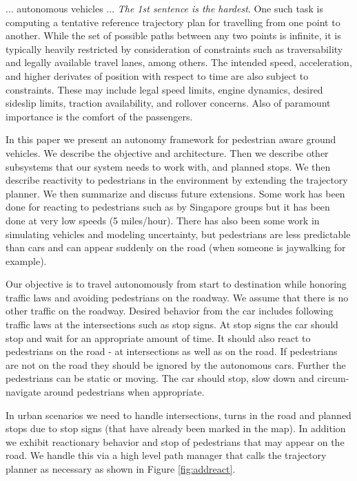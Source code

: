 \documentclass[letterpaper, 10 pt, conference]{ieeeconf}  %
\begin{document}
... autonomous vehicles ... \emph{The 1st sentence is the hardest}.
One such task is computing a tentative reference trajectory plan for travelling from one point to another.
While the set of possible paths between any two points is infinite, it is typically heavily restricted by consideration of constraints such as traversability and legally available travel lanes, among others.
The intended speed, acceleration, and higher derivates of position with respect to time are also subject to constraints.
These may include legal speed limits, engine dynamics, desired sideslip limits, traction availability, and rollover concerns.
Also of paramount importance is the comfort of the passengers.

In this paper we present an autonomy framework for pedestrian aware ground vehicles.
We describe the objective and architecture.
Then we describe other subsystems that our system needs to work with, and planned stops.
We then describe
reactivity to pedestrians in the environment by extending the trajectory planner.
We then summarize and discuss future extensions.
Some work has been done for reacting to pedestrians such as by Singapore groups but it has been done
at very low speeds (5 miles/hour).
There has also been some work in simulating vehicles and modeling
uncertainty, but pedestrians are less predictable than cars and can appear suddenly on the road 
(when someone is jaywalking for example).

Our objective is to travel autonomously from start to destination while honoring traffic laws and avoiding pedestrians on the roadway.
We assume that there is no other traffic on the roadway.
Desired behavior from the car includes following traffic laws at the intersections such as stop signs.
At stop signs the car should stop and wait for an appropriate amount of time.
It should also react to pedestrians on the road - at intersections as well as on the road.
If pedestrians are not on the road they should be ignored by the autonomous cars.
Further the pedestrians can be static or moving.
The car should stop, slow down and circum-navigate around pedestrians when appropriate.

In urban scenarios we need to handle intersections, turns in the road and planned stops due 
to stop signs (that have already been marked in the map).
In addition we exhibit reactionary 
behavior and stop of pedestrians that may appear on the road.
We handle this via a high 
level path manager that calls the trajectory planner as necessary as shown in Figure \ref{fig:addreact}.
\end{document}
